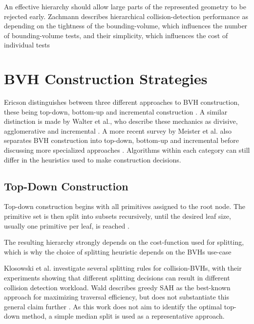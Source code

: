 An effective hierarchy should allow large parts of the represented geometry to be rejected early.
Zachmann describes hierarchical collision-detection performance as depending on the tightness of the bounding-volume, which influences the number of bounding-volume tests, and their simplicity, which influences the cost of individual tests\cite[p.~121]{zachmann2002minimal}

\section{BVH Construction Strategies}

Ericson distinguishes between three different approaches to BVH construction, these being top-down, bottom-up and incremental construction \cite[pp.~239--253]{ericson2004real}.
A similar distinction is made by Walter et al., who describe these mechanics as divisive, agglomerative and incremental \cite[p.~81]{walter2008agglomerative}.
A more recent survey by Meister et al. also separates BVH construction into top-down, bottom-up and incremental before discussing more specialized approaches \cite[pp.~686--688]{meister2021survey}.
Algorithms within each category can still differ in the heuristics used to make construction decisions.

\subsection{Top-Down Construction}

Top-down construction begins with all primitives assigned to the root node.
The primitive set is then split into subsets recursively, until the desired leaf size, usually one primitive per leaf, is reached \cite[pp.~240--244]{ericson2004real}.

The resulting hierarchy strongly depends on the cost-function used for splitting, which is why the choice of splitting heuristic depends on the BVHs use-case \cite[p.~81]{walter2008agglomerative} \cite[p.~34]{wald2007sah}

Klosowski et al. investigate several splitting rules for collision-BVHs, with their experiments showing that different splitting decisions can result in different collision detection workload. \cite{klosowski1998kdops}
Wald describes greedy SAH as the best-known approach for maximizing traversal efficiency, but does not substantiate this general claim further \cite[p.~34]{wald2007sah}.
As this work does not aim to identify the optimal top-down method, a simple median split is used as a representative approach.

